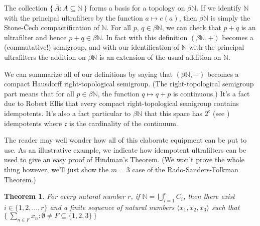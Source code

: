 \documentclass[12pt]{article}
\theoremstyle{plain}
\newtheorem{thm}{Theorem}[section]
\theoremstyle{definition}
\newcommand{\bbN}{\mathbb{N}}
\newcommand{\la}{\langle}
\newcommand{\ra}{\rangle}
\begin{document}
The collection $\{\, \overline{A} : A \subseteq \bbN \,\}$ forms a
basis for a topology on $\beta\bbN$.
If we identify $\bbN$ with the principal ultrafilters by the function
$a \mapsto e(a)$, then $\beta\bbN$ is simply the Stone-\v{C}ech
compactification of $\bbN$. 
For all $p$, $q \in \beta\bbN$, we can check that $p+q$ is an
ultrafilter and hence $p+q \in \beta\bbN$.
In fact with this definition $(\beta\bbN, +)$ becomes a (commutative!)
semigroup, and with our identification of $\bbN$ with the principal
ultrafilters the addition on $\beta\bbN$ is an extension of the usual
addition on $\bbN$. 

We can summarize all of our definitions by saying that $(\beta\bbN,
+)$ becomes a compact Hausdorff right-topological semigroup. 
(The right-topological semigroup part means that for all $p \in
\beta\bbN$, the function $q \mapsto q+p$ is continuous.)
It's a fact due to Robert Ellis that every compact right-topological
semigroup contains idempotents. 
It's also a fact particular to $\beta\bbN$ that this space has
$2^\mathfrak{c}$ (see \cite[Theorem 6.44]{Hindman:1998fk}) idempotents
where $\mathfrak{c}$ is the cardinality of the continuum. 

The reader may well wonder how all of this elaborate equipment can be
put to use. 
As an illustrative example, we indicate how idempotent ultrafilters
can be used to give an easy proof of Hindman's Theorem. 
(We won't prove the whole thing however, we'll just show the $m=3$
case of the Rado-Sanders-Folkman Theorem.)

  \begin{thm}
    For every natural number $r$, if  \/ $\bbN = \bigcup_{i=1}^r C_i$,
    then there exist $i \in \{1, 2, \ldots, r\}$ and a finite sequence
    of natural numbers $\la x_1, x_2, x_3 \ra$ such that $\bigl\{\,
    \sum_{n\in F} x_n : \emptyset \ne F \subseteq \{1,2,3\} \,\bigr\}$
  \end{thm}
\end{document}

